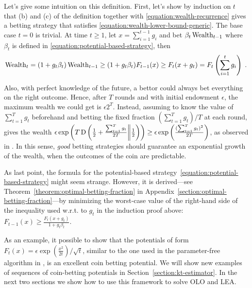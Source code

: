 Let's give some intuition on this definition.
First, let's show by induction on $t$ that (b) and (c) of
the definition together with \eqref{equation:wealth-recurrence} gives a betting strategy that 
satisfies \eqref{equation:wealth-lower-bound-generic}. The base case $t=0$ is trivial. At time $t \ge 1$, let $x = \sum_{i=1}^{t-1} g_i$ and bet $\beta_t \operatorname{Wealth}_{t-1}$ where $\beta_t$ is defined in \eqref{equation:potential-based-strategy}, then
\vspace{-.2cm}
\[
\operatorname{Wealth}_t
= (1+g_t \beta_t) \operatorname{Wealth}_{t-1}
\ge (1 + g_t \beta_t) F_{t-1}(x)
\ge F_t(x + g_t)
= F_t \left( \sum_{i=1}^t g_i \right) \; .
\]

Also, with perfect knowledge of the future, a bettor could always bet everything on the right outcome. Hence, after $T$ rounds and with initial endowment $\epsilon$, the maximum wealth we could get is $\epsilon 2^T$. 
Instead, assuming to know the value of $\sum_{t=1}^T g_t$ beforehand and betting the fixed fraction $(\sum_{t=1}^T g_t)/T$ at each round, gives the wealth 
$\epsilon \exp\left(T \operatorname*{D}\left({\tfrac{1}{2}+\tfrac{\sum_{t=1}^T g_t}{2 T}}\middle\|{\tfrac{1}{2}}\right)\right) \geq \epsilon \exp\left(\tfrac{(\sum_{t=1}^T g_t)^2}{2 T}\right)$, as observed in \cite{McMahan-Abernethy-2013}.
In this sense, \emph{good} betting strategies should guarantee an exponential growth of the wealth, when the outcomes of the coin are predictable.

As last point, the formula for the potential-based
strategy~\eqref{equation:potential-based-strategy} might seem strange. However,
it is derived---see Theorem~\ref{theorem:optimal-betting-fraction} in
Appendix~\ref{section:optimal-betting-fraction}---by minimizing the worst-case value of the right-hand side of the
inequality used w.r.t. to $g_t$ in the induction proof above: $F_{t-1}(x) \ge \tfrac{F_{t}(x + g_t)}{1+g_t\beta_t}$.

As an example, it possible to show that the potentials of form $F_t(x)=\epsilon \exp
\left(\tfrac{x^2}{2t}\right)/\sqrt{t}$, similar to the one used in the parameter-free algorithm in \cite{McMahan-Orabona-2014}, is an excellent coin betting potential.
We will show new examples of sequences of coin-betting potentials in
Section~\ref{section:kt-estimator}. In the next two sections we show how to use
this framework to solve \ac{OLO} and \ac{LEA}.
